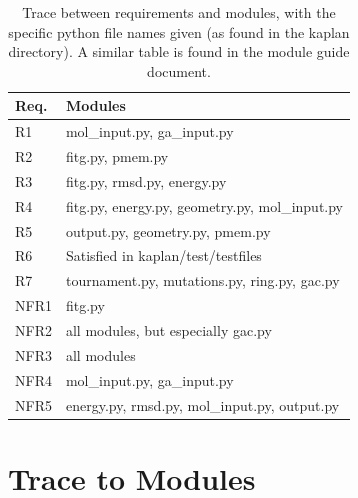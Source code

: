 \documentclass[12pt, titlepage]{article}
\begin{document}
\begin{table}[H]
	\centering
	\begin{tabular}{p{} p{}}
		\toprule
		\textbf{Req.} & \textbf{Modules}\\
		\midrule
		R1 & mol\_input.py, ga\_input.py \\
		R2 & fitg.py, pmem.py \\
		R3 & fitg.py, rmsd.py, energy.py \\
		R4 & fitg.py, energy.py, geometry.py, mol\_input.py \\
		R5 & output.py, geometry.py, pmem.py \\
		R6 & Satisfied in kaplan/test/testfiles \\
		R7 & tournament.py, mutations.py, ring.py, gac.py \\
		NFR1 & fitg.py \\
		NFR2 & all modules, but especially gac.py \\
		NFR3 & all modules \\
		NFR4 & mol\_input.py, ga\_input.py \\
		NFR5 & energy.py, rmsd.py, mol\_input.py, output.py \\
		\bottomrule
	\end{tabular}
	\caption{Trace between requirements and modules, with the specific python 
	file names given (as found in the kaplan directory). A similar table is 
	found in the module guide document.}
	\label{trace-RM}
\end{table}	

\section{Trace to Modules}
\end{document}
